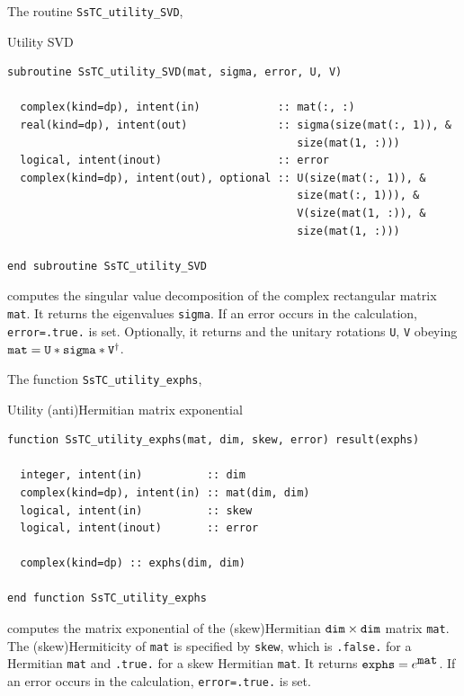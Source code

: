 \documentclass[10pt,a4paper]{article}
\begin{document}
The routine \verb|SsTC_utility_SVD|,
\begin{codebox}{Utility SVD}
\begin{lstlisting}[caption={Interface of ``utility SVD".},captionpos=b]
subroutine SsTC_utility_SVD(mat, sigma, error, U, V)

  complex(kind=dp), intent(in)            :: mat(:, :)
  real(kind=dp), intent(out)              :: sigma(size(mat(:, 1)), &
                                             size(mat(1, :)))
  logical, intent(inout)                  :: error
  complex(kind=dp), intent(out), optional :: U(size(mat(:, 1)), &
                                             size(mat(:, 1))), &
                                             V(size(mat(1, :)), &
                                             size(mat(1, :)))

end subroutine SsTC_utility_SVD
\end{lstlisting}
\end{codebox}
computes the singular value decomposition of the complex rectangular matrix \verb|mat|. It returns the eigenvalues \verb|sigma|. If an error occurs in the calculation, \verb|error=.true.| is set. Optionally, it returns and the unitary rotations \verb|U|, \verb|V| obeying $\verb|mat|= \verb|U|*\verb|sigma|*\verb|V|^{\dagger}$.

The function \verb|SsTC_utility_exphs|,
\begin{codebox}{Utility (anti)Hermitian matrix exponential}
\begin{lstlisting}[caption={Interface of ``utility exponential of matrix".},captionpos=b]
function SsTC_utility_exphs(mat, dim, skew, error) result(exphs)

  integer, intent(in)          :: dim
  complex(kind=dp), intent(in) :: mat(dim, dim)
  logical, intent(in)          :: skew
  logical, intent(inout)       :: error

  complex(kind=dp) :: exphs(dim, dim)

end function SsTC_utility_exphs
\end{lstlisting}
\end{codebox}
computes the matrix exponential of the (skew)Hermitian $\verb|dim|\times\verb|dim|$ matrix \verb|mat|. The (skew)Hermiticity of \verb|mat| is specified by \verb|skew|, which is \verb|.false.| for a Hermitian \verb|mat| and \verb|.true.| for a skew Hermitian \verb|mat|. It returns $\verb|exphs| = e^{\verb|mat|}$. If an error occurs in the calculation, \verb|error=.true.| is set.
\end{document}
